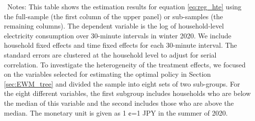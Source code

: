 \begin{landscape}
\begin{table}[H]
\begin{threeparttable}
\footnotesize{} {\ Notes: This table shows the estimation results for equation \ref{eq:reg_hte} using the full-sample (the first column of the upper panel) or sub-samples (the remaining columns). The dependent variable is the log of household-level electricity consumption over 30-minute intervals in winter 2020. We include household fixed effects and time fixed effects for each 30-minute interval. The standard errors are clustered at the household level to adjust for serial correlation. To investigate the heterogeneity of the treatment effects, we focused on the variables selected for estimating the optimal policy in Section \ref{sec:EWM_tree} and divided the sample into eight sets of two sub-groups. For the eight different variables, the first subgroup includes households who are below the median of this variable and the second includes those who are above the median. The monetary unit is given as 1 ¢=1 JPY in the summer of 2020.}

\end{threeparttable}
\end{table}
\end{landscape}